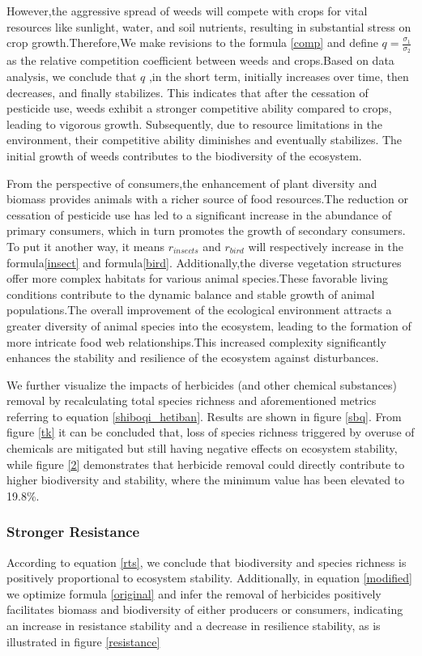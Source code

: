 \documentclass[12pt]{article}
\begin{document}
However,the aggressive spread of weeds will compete with crops for vital resources like sunlight, water, and soil nutrients, resulting in substantial stress on crop growth.Therefore,We make revisions to the formula \eqref{comp} and define  $q=\frac{\sigma_1}{\sigma_2}$   as the relative competition coefficient between weeds and crops.Based on data analysis, we conclude that $q$ ,in the short term, initially increases over time, then decreases, and finally stabilizes. This indicates that after the cessation of pesticide use, weeds exhibit a stronger competitive ability compared to crops, leading to vigorous growth. Subsequently, due to resource limitations in the environment, their competitive ability diminishes and eventually stabilizes. The initial growth of weeds contributes to the biodiversity of the ecosystem.

From the perspective of consumers,the enhancement of plant diversity and biomass provides animals with a richer source of food resources.The reduction or cessation of pesticide use has led to a significant increase in the abundance of primary consumers, which in turn promotes the growth of secondary consumers. To put it another way, it means $r_{insects}$ and $r_{bird}$ will respectively increase in the formula\eqref{insect} and formula\eqref{bird}. Additionally,the diverse vegetation structures offer more complex habitats for various animal species.These favorable living conditions contribute to the dynamic balance and stable growth of animal populations.The overall improvement of the ecological environment attracts a greater diversity of animal species into the ecosystem, leading to the formation of more intricate food web relationships.This increased complexity significantly enhances the stability and resilience of the ecosystem against disturbances.

We further visualize the impacts of herbicides (and other chemical substances) removal by recalculating total species richness and aforementioned metrics referring to equation \ref{shiboqi_hetiban}. Results are shown in figure \ref{sbq}. From figure \ref{tk} it can be concluded that, loss of species richness triggered by overuse of chemicals are mitigated but still having negative effects on ecosystem stability, while figure \ref{2} demonstrates that herbicide removal could directly contribute to higher biodiversity and stability, where the minimum value has been elevated to 19.8\%.

\subsubsection{Stronger Resistance}
\hspace{2em}According to equation \ref{rts}, we conclude that biodiversity and species richness is positively proportional to ecosystem stability. Additionally, in equation \ref{modified} we optimize formula \ref{original} and infer the removal of herbicides positively facilitates biomass and biodiversity of either producers or consumers, indicating an increase in resistance stability and a decrease in resilience stability, as is illustrated in figure \ref{resistance}
\end{document}
